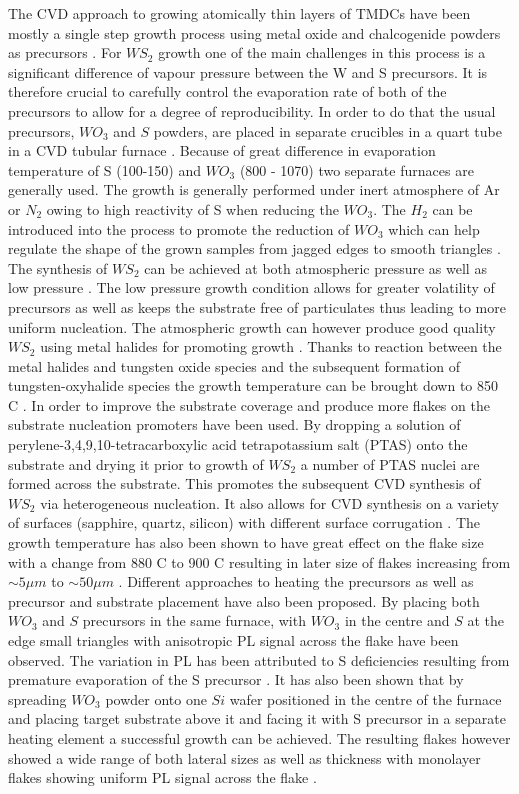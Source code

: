 The CVD approach to growing atomically thin layers of TMDCs have been mostly a single step growth process using metal oxide and chalcogenide powders as precursors \cite{Reale2016}\cite{doi:10.1021/nn4046002}\cite{Cong2013}\cite{Rong2014}\cite{Dumcenco2015}\cite{Lee2012}\cite{Ling2014}\cite{Najmaei2013}\cite{Ji2013}\cite{Zhang2014a}\cite{Yu2013}. For $WS_2$ growth one of the main challenges in this process is a significant difference of vapour pressure between the W and S precursors. It is therefore crucial to carefully control the evaporation rate of both of the precursors to allow for a degree of reproducibility. In order to do that the usual precursors, $WO_3$ and $S$ powders, are placed in separate crucibles in a quart tube in a CVD tubular furnace \cite{Bosi2015}\cite{Shi2015}. Because of great difference in evaporation temperature of S (100-150{\degree}) and $WO_3$ (800 - 1070{\degree}) two separate furnaces are generally used. The growth is generally performed under inert atmosphere of Ar or $N_2$ owing to high reactivity of S when reducing the $WO_3$. The $H_2$ can be introduced into the process to promote the reduction of $WO_3$ which can help regulate the shape of the grown samples from jagged edges to smooth triangles \cite{doi:10.1021/nn403454e}. The synthesis of $WS_2$ can be achieved at both atmospheric pressure as well as low pressure \cite{Bosi2015}\cite{Shi2015}. The low pressure growth condition allows for greater volatility of precursors as well as keeps the substrate free of particulates thus leading to more uniform nucleation. The atmospheric growth can however produce good quality $WS_2$ using metal halides for promoting growth \cite{Li2015}. Thanks to reaction between the metal halides and tungsten oxide species and the subsequent formation of tungsten-oxyhalide species the growth temperature can be brought down to 850 {\degree}C \cite{Li2015}. In order to improve the substrate coverage and produce more flakes on the substrate nucleation promoters have been used. By dropping a solution of perylene-3,4,9,10-tetracarboxylic acid tetrapotassium salt (PTAS) onto the substrate and drying it prior to growth of $WS_2$ a number of PTAS nuclei are formed across the substrate. This promotes the subsequent CVD synthesis of $WS_2$ via heterogeneous nucleation. It also allows for CVD synthesis on a variety of surfaces (sapphire, quartz, silicon) with different surface corrugation \cite{Lee2013}. The growth temperature has also been shown to have great effect on the flake size with a change from 880 {\degree}C to 900 {\degree}C resulting in later size of flakes increasing from $\sim 5 \mu m$ to $\sim 50 \mu m$ \cite{doi:10.1021/nn403454e}. Different approaches to heating the precursors as well as precursor and substrate placement have also been proposed. By placing both $WO_3$ and $S$ precursors in the same furnace, with $WO_3$ in the centre and $S$ at the edge small triangles with anisotropic PL signal across the flake have been observed. The variation in PL has been attributed to S deficiencies resulting from premature evaporation of the S precursor \cite{doi:10.1021/nn4046002}. It has also been shown that by spreading $WO_3$ powder onto one $Si$ wafer positioned in the centre of the furnace and placing target substrate above it and facing it with S precursor in a separate heating element a successful growth can be achieved. The resulting flakes however showed a wide range of both lateral sizes as well as thickness with monolayer flakes showing uniform PL signal across the flake \cite{Cong2013}.